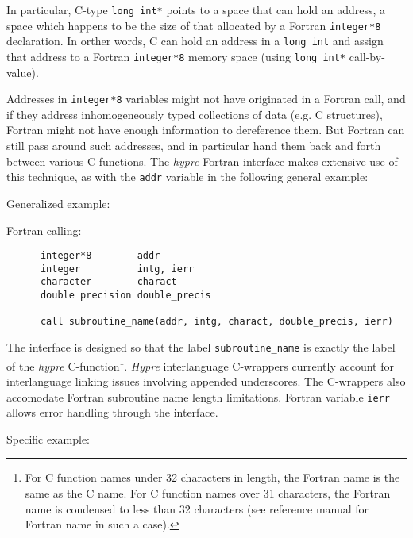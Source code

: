 \vspace{0.2in}

In particular, C-type
\verb+long int*+ points to a space that can hold an address, a space
which happens to be the size of that allocated by a Fortran
\verb+integer*8+ declaration.
In orther words, C can hold an address in a \verb+long int+ and
assign that address to a Fortran \verb+integer*8+ memory space
(using \verb+long int*+ call-by-value).

Addresses in \verb+integer*8+ variables might not have originated
in a Fortran call, and if they address inhomogeneously typed collections
of data (e.g. C structures), Fortran might not have enough information to
dereference them.  But Fortran can still pass around such addresses, and in
particular hand them back and forth between various C functions.  The
{\slshape hypre} Fortran interface makes extensive use of this technique,
as with the \verb+addr+ variable in the following general example:

\vspace{0.1in}

\noindent Generalized example:

\vspace{0.1in}

  Fortran calling:
\begin{verbatim}
      integer*8        addr
      integer          intg, ierr
      character        charact
      double precision double_precis

      call subroutine_name(addr, intg, charact, double_precis, ierr)
\end{verbatim}

The interface is designed so that the label \verb+subroutine_name+ is exactly
the label of the {\slshape hypre} C-function\footnote{For C
function names under 32 characters in length, the Fortran name is the same
as the C name.  For C function names over 31 characters, the Fortran
name is condensed to less than 32 characters (see reference manual for
Fortran name in such a case).}.
{\slshape Hypre} interlanguage C-wrappers currently
account for interlanguage linking issues involving appended
underscores.  The C-wrappers also accomodate Fortran subroutine name length
limitations.  Fortran variable \verb+ierr+ allows error handling through
the interface.

\vspace{0.1in}

\noindent Specific example:

\vspace{0.1in}

